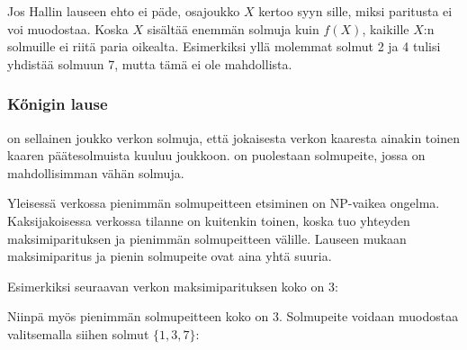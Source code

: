 Jos Hallin lauseen ehto ei päde, osajoukko $X$
kertoo syyn sille, miksi paritusta ei voi muodostaa.
Koska $X$ sisältää enemmän solmuja kuin $f(X)$,
kaikille $X$:n solmuille ei riitä paria oikealta.
Esimerkiksi yllä molemmat solmut 2 ja 4 tulisi
yhdistää solmuun 7, mutta tämä ei ole mahdollista.

\subsubsection{Kőnigin lause}


 on sellainen joukko
verkon solmuja, että jokaisesta verkon kaaresta ainakin
toinen kaaren päätesolmuista kuuluu joukkoon.
 on puolestaan solmupeite,
jossa on mahdollisimman vähän solmuja.

Yleisessä verkossa pienimmän solmupeitteen
etsiminen on NP-vaikea ongelma.
Kaksijakoisessa verkossa tilanne on kuitenkin
toinen, koska  tuo yhteyden
maksimiparituksen ja pienimmän solmupeitteen välille.
Lauseen mukaan maksimiparitus ja
pienin solmupeite ovat aina yhtä suuria.

Esimerkiksi seuraavan verkon maksimiparituksen koko on 3:

\begin{center}
\end{center}

Niinpä myös pienimmän solmupeitteen koko on 3.
Solmupeite voidaan muodostaa valitsemalla siihen
solmut $\{1,3,7\}$:

